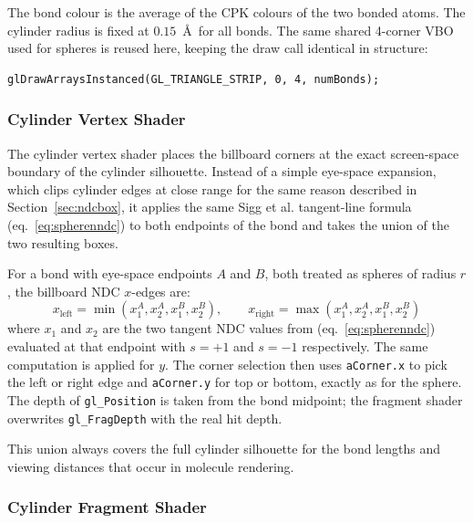 \documentclass[12pt, a4paper]{article}
\begin{document}
The bond colour is the average of the CPK colours of the two bonded atoms. The cylinder radius is fixed at $0.15$~\AA\ for all bonds. The same shared 4-corner VBO used for spheres is reused here, keeping the draw call identical in structure:

\begin{lstlisting}[style=cppstyle]
glDrawArraysInstanced(GL_TRIANGLE_STRIP, 0, 4, numBonds);
\end{lstlisting}

\subsubsection{Cylinder Vertex Shader}

The cylinder vertex shader places the billboard corners at the exact screen-space boundary of the cylinder silhouette. Instead of a simple eye-space expansion, which clips cylinder edges at close range for the same reason described in Section~\ref{sec:ndcbox}, it applies the same Sigg et al. tangent-line formula (eq.~\ref{eq:spherenndc}) to both endpoints of the bond and takes the union of the two resulting boxes.

For a bond with eye-space endpoints $A$ and $B$, both treated as spheres of radius $r$, the billboard NDC $x$-edges are:
\begin{equation}
    x_{\mathrm{left}} = \min(x_1^A, x_2^A, x_1^B, x_2^B), \qquad x_{\mathrm{right}} = \max(x_1^A, x_2^A, x_1^B, x_2^B)
    \label{eq:cylndcbox}
\end{equation}
where $x_1$ and $x_2$ are the two tangent NDC values from (eq.~\ref{eq:spherenndc}) evaluated at that endpoint with $s = +1$ and $s = -1$ respectively. The same computation is applied for $y$. The corner selection then uses \texttt{aCorner.x} to pick the left or right edge and \texttt{aCorner.y} for top or bottom, exactly as for the sphere. The depth of \texttt{gl\_Position} is taken from the bond midpoint; the fragment shader overwrites \texttt{gl\_FragDepth} with the real hit depth.

This union always covers the full cylinder silhouette for the bond lengths and viewing distances that occur in molecule rendering.

\subsubsection{Cylinder Fragment Shader}
\end{document}
